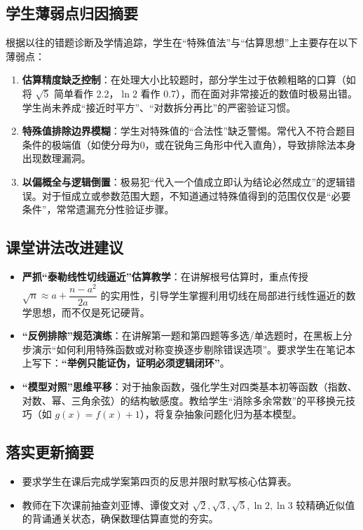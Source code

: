 \documentclass[11pt,a4paper]{ctexart}
\begin{document}
\subsection{学生薄弱点归因摘要}
根据以往的错题诊断及学情追踪，学生在“特殊值法”与“估算思想”上主要存在以下薄弱点：
\begin{enumerate}[label=\arabic*. , leftmargin=2em, itemsep=0.1em, topsep=0.2em]
  \item \textbf{估算精度缺乏控制}：在处理大小比较题时，部分学生过于依赖粗略的口算（如将 \(\sqrt{5}\) 简单看作 2.2，\(\ln 2\) 看作 0.7），而在面对非常接近的数值时极易出错。学生尚未养成“接近时平方”、“对数拆分再比”的严密验证习惯。
  \item \textbf{特殊值排除边界模糊}：学生对特殊值的“合法性”缺乏警惕。常代入不符合题目条件的极端值（如使分母为0，或在锐角三角形中代入直角），导致排除法本身出现数理漏洞。
  \item \textbf{以偏概全与逻辑倒置}：极易犯“代入一个值成立即认为结论必然成立”的逻辑错误。对于恒成立或参数范围大题，不知道通过特殊值得到的范围仅仅是“必要条件”，常常遗漏充分性验证步骤。
\end{enumerate}

\subsection{课堂讲法改进建议}
\begin{itemize}[leftmargin=2em, itemsep=0.1em, topsep=0.2em]
  \item \textbf{严抓“泰勒线性切线逼近”估算教学}：在讲解根号估算时，重点传授 \(\sqrt{n} \approx a + \dfrac{n-a^2}{2a}\) 的实用性，引导学生掌握利用切线在局部进行线性逼近的数学思想，而不仅是死记硬背。
  \item \textbf{“反例排除”规范演练}：在讲解第一题和第四题等多选/单选题时，在黑板上分步演示“如何利用特殊函数或对称变换逐步剔除错误选项”。要求学生在笔记本上写下：\textbf{“举例只能证伪，证明必须逻辑闭环”}。
  \item \textbf{“模型对照”思维平移}：对于抽象函数，强化学生对四类基本初等函数（指数、对数、幂、三角余弦）的结构敏感度。教给学生“消除多余常数”的平移换元技巧（如 \(g(x)=f(x)+1\)），将复杂抽象问题化归为基本模型。
\end{itemize}

\subsection{落实更新摘要}
\begin{itemize}[leftmargin=2em, itemsep=0.1em, topsep=0.2em]
  \item 要求学生在课后完成学案第四页的反思并限时默写核心估算表。
  \item 教师在下次课前抽查刘亚博、谭俊文对 \(\sqrt{2},\sqrt{3},\sqrt{5},\ln 2,\ln 3\) 较精确近似值的背诵通关状态，确保数理估算直觉的夯实。
\end{itemize}
\end{document}
